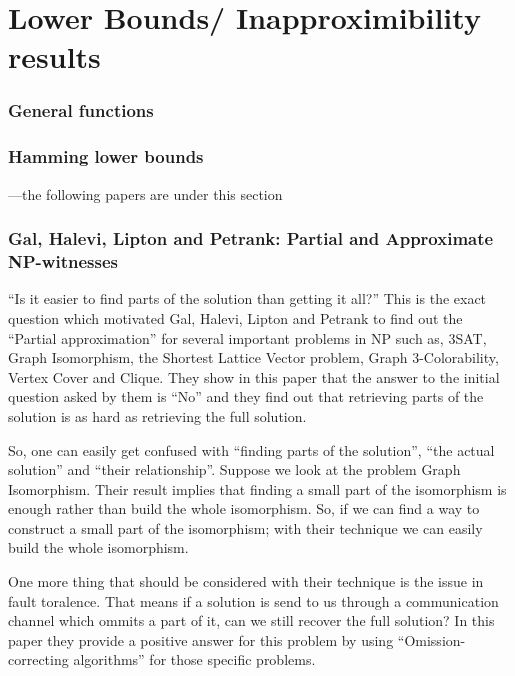 \chapter{Lower Bounds/ Inapproximibility results}
\label{chap:3}

\subsection{General functions}

\subsection{Hamming lower bounds}
---the following papers are under this section

\subsection{Gal, Halevi, Lipton and Petrank: Partial and Approximate NP-witnesses}


"`Is it easier to find parts of the solution than getting it all?"' This is the exact question which motivated Gal, Halevi, Lipton and Petrank \cite{GHLP99} to find out the "`Partial approximation"' for several important problems in NP such as, 3SAT, Graph Isomorphism, the Shortest Lattice Vector problem, Graph 3-Colorability, Vertex Cover and Clique. They show in this paper that the answer to the initial question asked by them is "`No"' and they find out that retrieving parts of the solution is as hard as retrieving the full solution. 

So, one can easily get confused with "`finding parts of the solution"', "`the actual solution"' and "`their relationship"'. Suppose we look at the problem Graph Isomorphism. Their result \cite{GHLP99} implies that finding a small part of the isomorphism is enough rather than build the whole isomorphism.  So, if we can find a way to construct a small part of the isomorphism; with their technique we can easily build the whole isomorphism. 

One more thing that should be considered with their technique is the issue in fault toralence. That means if a solution is send to us through a communication channel which ommits a part of it, can we still recover the full solution? In this paper they provide a positive answer for this problem by using "`Omission-correcting algorithms"' for those specific problems.

